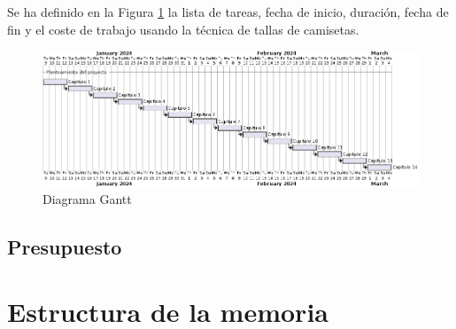 Se ha definido en la Figura \ref{fig:gantt} la lista de tareas, fecha de inicio, duración, fecha de fin y el coste de trabajo usando la técnica de tallas de camisetas.


\begin{figure}[H]
    \centering
    \includegraphics[width=1\linewidth]{figures/chapter01/Gantt.png}
    \caption{Diagrama Gantt}
    \label{fig:gantt}
\end{figure}

\subsection{Presupuesto}



\section{Estructura de la memoria}

